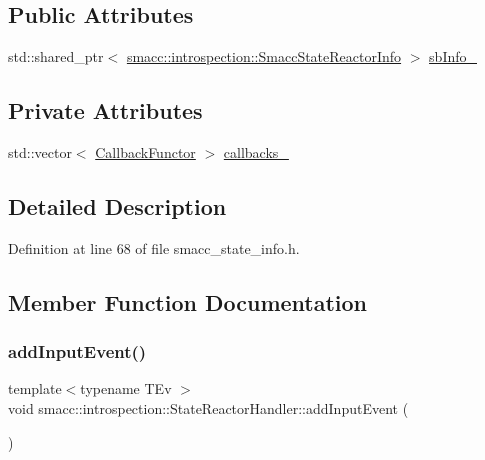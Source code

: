 \subsection*{Public Attributes}
\begin{DoxyCompactItemize}
\item 
std\+::shared\+\_\+ptr$<$ \hyperlink{structsmacc_1_1introspection_1_1SmaccStateReactorInfo}{smacc\+::introspection\+::\+Smacc\+State\+Reactor\+Info} $>$ \hyperlink{classsmacc_1_1introspection_1_1StateReactorHandler_a6dbf5d1458265c3565e18ac77851ae63}{sb\+Info\+\_\+}
\end{DoxyCompactItemize}
\subsection*{Private Attributes}
\begin{DoxyCompactItemize}
\item 
std\+::vector$<$ \hyperlink{structsmacc_1_1introspection_1_1CallbackFunctor}{Callback\+Functor} $>$ \hyperlink{classsmacc_1_1introspection_1_1StateReactorHandler_a36afd8fbef7a62112c3a7c81ed364876}{callbacks\+\_\+}
\end{DoxyCompactItemize}


\subsection{Detailed Description}


Definition at line 68 of file smacc\+\_\+state\+\_\+info.\+h.



\subsection{Member Function Documentation}
\mbox{\label{classsmacc_1_1introspection_1_1StateReactorHandler_aef392b9521dc4484ef84082844cd3538}} 
\subsubsection{\texorpdfstring{add\+Input\+Event()}{addInputEvent()}}
{\footnotesize\ttfamily template$<$typename T\+Ev $>$ \\
void smacc\+::introspection\+::\+State\+Reactor\+Handler\+::add\+Input\+Event (\begin{DoxyParamCaption}{ }\end{DoxyParamCaption})}



